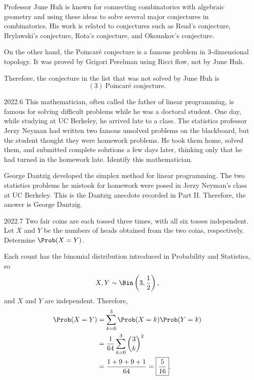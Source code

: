     \begin{solution}
        Professor June Huh is known for connecting combinatorics with algebraic geometry and using
        these ideas to solve several major conjectures in combinatorics. His work is related to
        conjectures such as Read's conjecture, Brylawski's conjecture, Rota's conjecture, and
        Okounkov's conjecture.

        On the other hand, the Poincaré conjecture is a famous problem in $3$-dimensional topology.
        It was proved by Grigori Perelman using Ricci flow, not by June Huh.

        Therefore, the conjecture in the list that was not solved by June Huh is
        \[
            \boxed{(3)\ \text{Poincaré conjecture}}.
        \]
    \end{solution}

    \begin{pastproblem}{2022.6}
        This mathematician, often called the father of linear programming, is famous for solving
        difficult problems while he was a doctoral student. One day, while studying at UC Berkeley,
        he arrived late to a class. The statistics professor Jerzy Neyman had written two famous
        unsolved problems on the blackboard, but the student thought they were homework problems. He
        took them home, solved them, and submitted complete solutions a few days later, thinking
        only that he had turned in the homework late. Identify this mathematician.
    \end{pastproblem}

    \begin{solution}
George Dantzig developed the simplex method for linear programming.
        The two statistics problems he mistook for homework were posed in
        Jerzy Neyman's class at UC Berkeley. This is the Dantzig anecdote
        recorded in Part II.
        Therefore, the answer is $\boxed{\text{George Dantzig}}$.
    \end{solution}

    \begin{pastproblem}{2022.7}
        Two fair coins are each tossed three times, with all six tosses
        independent. Let $X$ and $Y$ be the numbers of heads obtained from the
        two coins, respectively. Determine $\Prob(X=Y)$.
    \end{pastproblem}

    \begin{solution}
        Each count has the binomial distribution introduced in Probability and Statistics, so
        \[
            X,Y\sim\Bin\left(3,\frac12\right),
        \]
        and $X$ and $Y$ are independent. Therefore,
        \[
            \begin{aligned}
                \Prob(X=Y)
                &=
                \sum_{k=0}^{3}\Prob(X=k)\Prob(Y=k)\\
                &=
                \frac{1}{64}\sum_{k=0}^{3}\binom{3}{k}^2\\
                &=
                \frac{1+9+9+1}{64}
                =
                \boxed{\frac{5}{16}}.
            \end{aligned}
        \]
    \end{solution}

